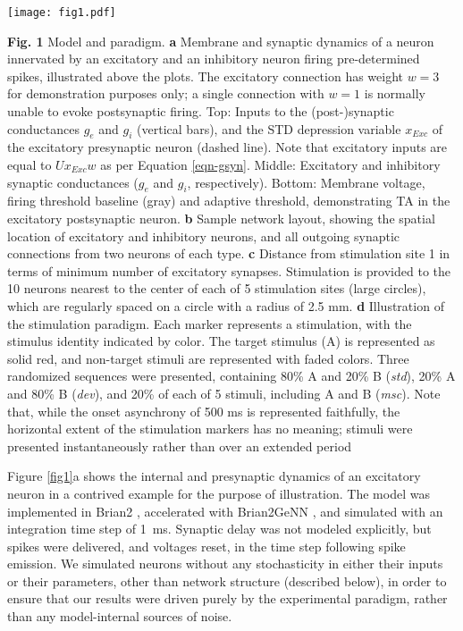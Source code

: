 \documentclass[pdflatex,referee,iicol,sn-basic]{sn-jnl}
\newcommand{\dev}{\textit{dev}}
\newcommand{\msc}{\textit{msc}}
\newcommand{\std}{\textit{std}}
\newcommand{\refpanel}[2]{Figure \ref{fig#1}\lowercase{#2}}
\begin{document}
\begin{figure*}%
    \centering
    \texttt{[image: fig1.pdf]}
    \caption{}
    \label{fig1}
\end{figure*}
\textbf{Fig. 1} Model and paradigm.
\textbf{a} Membrane and synaptic dynamics of a neuron innervated by an excitatory and an inhibitory neuron firing pre-determined spikes, illustrated above the plots. The excitatory connection has weight $w = 3$ for demonstration purposes only; a single connection with $w = 1$ is normally unable to evoke postsynaptic firing. Top: Inputs to the (post-)synaptic conductances $g_e$ and $g_i$ (vertical bars), and the STD depression variable $x_{Exc}$ of the excitatory presynaptic neuron (dashed line). Note that excitatory inputs are equal to $U x_{Exc} w$ as per Equation \ref{eqn-gsyn}. Middle: Excitatory and inhibitory synaptic conductances ($g_e$ and $g_i$, respectively). Bottom: Membrane voltage, firing threshold baseline (gray) and adaptive threshold, demonstrating TA in the excitatory postsynaptic neuron.
\textbf{b} Sample network layout, showing the spatial location of excitatory and inhibitory neurons, and all outgoing synaptic connections from two neurons of each type.
\textbf{c} Distance from stimulation site 1 in terms of minimum number of excitatory synapses. Stimulation is provided to the 10 neurons nearest to the center of each of 5 stimulation sites (large circles), which are regularly spaced on a circle with a radius of 2.5 mm.
\textbf{d} Illustration of the stimulation paradigm. Each marker represents a stimulation, with the stimulus identity indicated by color. The target stimulus (A) is represented as solid red, and non-target stimuli are represented with faded colors. Three randomized sequences were presented, containing 80\% A and 20\% B (\std{}), 20\% A and 80\% B (\dev{}), and 20\% of each of 5 stimuli, including A and B (\msc{}). Note that, while the onset asynchrony of 500 ms is represented faithfully, the horizontal extent of the stimulation markers has no meaning; stimuli were presented instantaneously rather than over an extended period

\refpanel{1}{a} shows the internal and presynaptic dynamics of an excitatory neuron in a contrived example for the purpose of illustration. The model was implemented in Brian2 \citep{Stimberg2019-tc}, accelerated with Brian2GeNN \citep{Stimberg2020-go}, and simulated with an integration time step of 1~ms. Synaptic delay was not modeled explicitly, but spikes were delivered, and voltages reset, in the time step following spike emission. We simulated neurons without any stochasticity in either their inputs or their parameters, other than network structure (described below), in order to ensure that our results were driven purely by the experimental paradigm, rather than any model-internal sources of noise.
\end{document}
